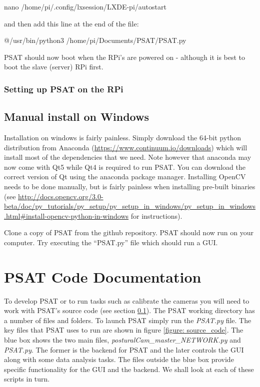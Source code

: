 \documentclass[12pt,a4paper]{report}
\begin{document}
		nano /home/pi/.config/lxsession/LXDE-pi/autostart	

		\noindent and then add this line at the end of the file:

		@/usr/bin/python3 /home/pi/Documents/PSAT/PSAT.py

		\noindent PSAT should now boot when the RPi's are powered on - although it is best to boot the slave (server) RPi first. 
		
		\subsubsection{Setting up PSAT on the RPi}
		
	\subsection{Manual install on Windows}
	\label{section: windows}
		Installation on windows is fairly painless. Simply download the 64-bit python distribution from Anaconda (\url{https://www.continuum.io/downloads}) which will install most of the dependencies that we need. Note however that anaconda may now come with Qt5 while Qt4 is required to run PSAT. You can download the correct version of Qt using the anaconda package manager. Installing OpenCV needs to be done manually, but is fairly painless when installing pre-built binaries (see \url{http://docs.opencv.org/3.0-beta/doc/py_tutorials/py_setup/py_setup_in_windows/py_setup_in_windows.html#install-opencv-python-in-windows} for instructions).
		
		Clone a copy of PSAT from the github repository. PSAT should now run on your computer. Try executing the ``PSAT.py'' file which should run a GUI.
		
		
	 \section{PSAT Code Documentation}
	 
	 To develop PSAT or to run tasks such as calibrate the cameras you will need to work with PSAT's source code (see section \ref{section: windows}). The PSAT working directory has a number of files and folders. To launch PSAT simply run the \textit{PSAT.py} file. The key files that PSAT uses to run are shown in figure \ref{figure: source_code}. The blue box shows the two main files, \textit{posturalCam\_master\_NETWORK.py} and \textit{PSAT.py}. The former is the backend for PSAT and the later controls the GUI along with some data analysis tasks. The files outside the blue box provide specific functionality for the GUI and the backend. We shall look at each of these scripts in turn.
	 
\end{document}
